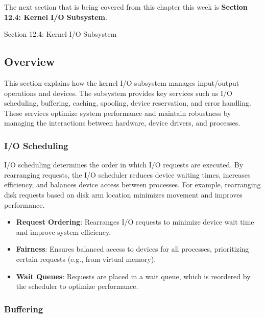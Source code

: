 The next section that is being covered from this chapter this week is \textbf{Section 12.4: Kernel I/O Subsystem}.

\begin{notes}{Section 12.4: Kernel I/O Subsystem}
    \subsection*{Overview}

    This section explains how the kernel I/O subsystem manages input/output operations and devices. The subsystem provides key services such as I/O scheduling, buffering, caching, spooling, device 
    reservation, and error handling. These services optimize system performance and maintain robustness by managing the interactions between hardware, device drivers, and processes.
    
    \subsubsection*{I/O Scheduling}
    
    I/O scheduling determines the order in which I/O requests are executed. By rearranging requests, the I/O scheduler reduces device waiting times, increases efficiency, and balances device access 
    between processes. For example, rearranging disk requests based on disk arm location minimizes movement and improves performance.
    
    \begin{highlight}[I/O Scheduling]
    
        \begin{itemize}
            \item \textbf{Request Ordering}: Rearranges I/O requests to minimize device wait time and improve system efficiency.
            \item \textbf{Fairness}: Ensures balanced access to devices for all processes, prioritizing certain requests (e.g., from virtual memory).
            \item \textbf{Wait Queues}: Requests are placed in a wait queue, which is reordered by the scheduler to optimize performance.
        \end{itemize}
    
    \end{highlight}
    
    \subsubsection*{Buffering}
    

\end{notes}
